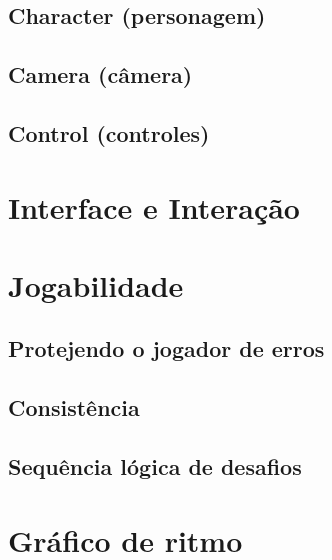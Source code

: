 \expandafter\documentclass\expandafter[table, usenames, svgnames, dvipsnames, \classopts]{beamer}
\begin{document}
\subsection{Character (personagem)}
\subsection{Camera (câmera)}
\subsection{Control (controles)}


\section{Interface e Interação}


\section{Jogabilidade}

\subsection{Protejendo o jogador de erros} %
\subsection{Consistência}
\subsection{Sequência lógica de desafios}


\section{Gráfico de ritmo}
\end{document}
